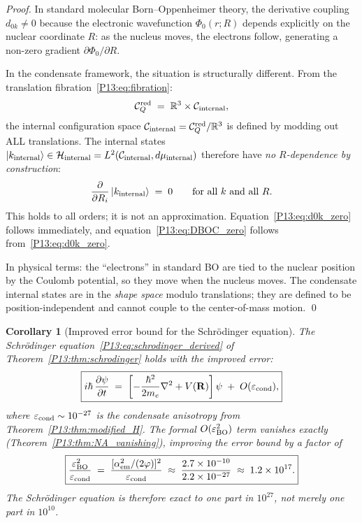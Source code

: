 \documentclass[11pt,a4paper]{article}
\newtheorem{corollary}[theorem]{Corollary}
\theoremstyle{definition}
\theoremstyle{remark}
\newcommand{\vp}{\varphi}
\newcommand{\aem}{\alpha_{\mathrm{em}}}
\newcommand{\eps}{\varepsilon}
\begin{document}
\begin{proof}
In standard molecular Born--Oppenheimer theory, the derivative coupling
$d_{0k}\neq0$ because the electronic wavefunction $\Phi_0(r;R)$
depends explicitly on the nuclear coordinate $R$: as the nucleus moves,
the electrons follow, generating a non-zero gradient $\partial\Phi_0/\partial R$.

In the condensate framework, the situation is structurally different.
From the translation fibration~\eqref{P13:eq:fibration}:
\begin{equation}
  \mathcal{C}_Q^{\rm red} \;=\; \mathbb{R}^3 \times \mathcal{C}_{\rm internal},
  \label{P13:eq:fibration_recalled}
\end{equation}
the internal configuration space $\mathcal{C}_{\rm internal}=\mathcal{C}_Q^{\rm red}/\mathbb{R}^3$
is defined by modding out ALL translations.
The internal states
$|k_{\rm internal}\rangle\in\mathcal{H}_{\rm internal}=L^2(\mathcal{C}_{\rm internal},d\mu_{\rm internal})$
therefore have \emph{no $R$-dependence by construction}:
\begin{equation}
  \frac{\partial}{\partial R_i}\,|k_{\rm internal}\rangle \;=\; 0
  \qquad\text{for all } k \text{ and all } R.
  \label{P13:eq:internal_R_indep}
\end{equation}
This holds to all orders; it is not an approximation.
Equation~\eqref{P13:eq:d0k_zero} follows immediately, and
equation~\eqref{P13:eq:DBOC_zero} follows from~\eqref{P13:eq:d0k_zero}.

In physical terms: the ``electrons'' in standard BO are tied to the nuclear position
by the Coulomb potential, so they move when the nucleus moves.
The condensate internal states are in the \emph{shape space} modulo translations;
they are defined to be position-independent and cannot couple to the center-of-mass motion.
\qed
\end{proof}

\begin{corollary}[Improved error bound for the Schr\"odinger equation]
\label{P13:cor:improved_BO}
The Schr\"odinger equation~\eqref{P13:eq:schrodinger_derived} of
Theorem~\ref{P13:thm:schrodinger} holds with the improved error:
\begin{equation}
  \boxed{i\hbar\,\frac{\partial\psi}{\partial t}
  \;=\;
  \left[-\frac{\hbar^2}{2m_e}\nabla^2 + V(\mathbf{R})\right]\psi
  \;+\; O(\eps_{\rm cond}),}
  \label{P13:eq:schrodinger_improved}
\end{equation}
where $\eps_{\rm cond}\sim10^{-27}$ is the condensate anisotropy
from Theorem~\ref{P13:thm:modified_H}.
The formal $O(\eps_{\rm BO}^2)$ term vanishes exactly
(Theorem~\ref{P13:thm:NA_vanishing}), improving the error bound by
a factor of
\begin{equation}
  \boxed{\frac{\eps_{\rm BO}^2}{\eps_{\rm cond}}
  \;=\; \frac{[\aem^2/(2\vp)]^2}{\eps_{\rm cond}}
  \;\approx\; \frac{2.7\times10^{-10}}{2.2\times10^{-27}}
  \;\approx\; 1.2\times10^{17}.}
  \label{P13:eq:improvement_factor}
\end{equation}
The Schr\"odinger equation is therefore exact to one part in $10^{27}$,
not merely one part in $10^{10}$.
\end{corollary}
\end{document}
